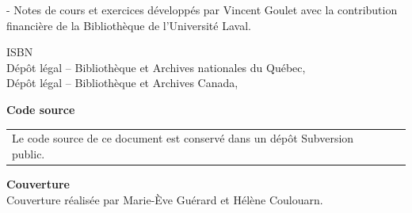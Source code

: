 \begin{adjustwidth*}{\unitlength}{-\unitlength}
  Notes de cours et exercices développés par Vincent Goulet avec la
  contribution financière de la Bibliothèque de l'Université Laval.
  \vfill

  ISBN {\ISBN} \\
  Dépôt légal -- Bibliothèque et Archives nationales du Québec, {\year} \\
  Dépôt légal -- Bibliothèque et Archives Canada, {\year}
  \vfill

  \textbf{Code source} \\[4pt]
  \begin{tabularx}{1.0\linewidth}{@{}Xl@{}}
    Le code source de ce document est conservé dans un dépôt
    Subversion public. &
                         \raisebox{-7pt}{%
                         \href{https://svn.fsg.ulaval.ca/svn-pub/vgoulet/formation_latex/}{%
                         \browsebutton}}
  \end{tabularx}
  \vfill

  \textbf{Couverture} \\
  Couverture réalisée par Marie-Ève Guérard et Hélène Coulouarn.
\end{adjustwidth*}
\endgroup

